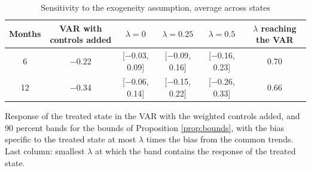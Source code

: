\begin{table}[htbp]
\centering
\caption{Sensitivity to the exogeneity assumption, average across states\label{tab:eb-bounds}}
\small
\begin{tabular}{cccccc}
\toprule
Months & VAR with controls added & $\lambda=0$ & $\lambda=0.25$ & $\lambda=0.5$ & $\lambda$ reaching the VAR \\
\midrule
6 & $-$0.22 & [$-$0.03, 0.09] & [$-$0.09, 0.16] & [$-$0.16, 0.23] & 0.70 \\
12 & $-$0.34 & [$-$0.06, 0.14] & [$-$0.15, 0.22] & [$-$0.26, 0.33] & 0.66 \\
\bottomrule
\end{tabular}
\par\smallskip\parbox{0.95\textwidth}{\footnotesize Response of the treated state in the VAR with the weighted controls added, and 90 percent bands for the bounds of Proposition \ref{prop:bounds}, with the bias specific to the treated state at most $\lambda$ times the bias from the common trends. Last column: smallest $\lambda$ at which the band contains the response of the treated state.}
\end{table}

